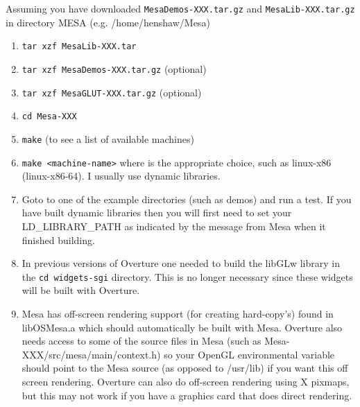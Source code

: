 \documentclass{article}
\begin{document}
Assuming you have downloaded {\tt MesaDemos-XXX.tar.gz} and {\tt  MesaLib-XXX.tar.gz}
in directory MESA (e.g. /home/henshaw/Mesa)
 \begin{enumerate}
   \item {\tt tar xzf MesaLib-XXX.tar}
   \item {\tt tar xzf MesaDemos-XXX.tar.gz} (optional)
   \item {\tt tar xzf MesaGLUT-XXX.tar.gz} (optional)
   \item {\tt cd Mesa-XXX}
   \item {\tt make} (to see a list of available machines)
   \item {\tt make <machine-name>} where {\tt <machine-name>} is the appropriate choice, such as
        linux-x86 (linux-x86-64). I usually use dynamic libraries.
   \item Goto to one of the example directories (such as demos) and run a test. If you have built
       dynamic libraries then you will first need to set your LD\_LIBRARY\_PATH as indicated by
       the message from Mesa when it finished building.
   \item In previous versions of Overture one needed to build the libGLw library in the
        {\tt cd widgets-sgi} directory. This is no longer necessary since these widgets
      will be built with Overture.
   \item Mesa has off-screen rendering support (for creating hard-copy's) found in libOSMesa.a which should
        automatically be built with Mesa. Overture also needs access to some of the source files in Mesa
        (such as Mesa-XXX/src/mesa/main/context.h)  so your OpenGL environmental variable should point to the
        Mesa source (as opposed to /usr/lib) if you want this off screen rendering. Overture can also
        do off-screen rendering using X pixmaps, but this may not work if you have a graphics card that
        does direct rendering.

\end{enumerate}
\end{document}
